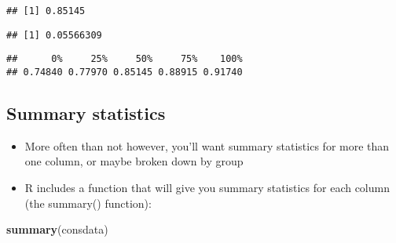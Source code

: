\documentclass[]{article}
\newenvironment{Shaded}{\begin{snugshade}}{\end{snugshade}}
\newcommand{\KeywordTok}[1]{\textcolor[rgb]{0.13,0.29,0.53}{\textbf{#1}}}
\newcommand{\OperatorTok}[1]{\textcolor[rgb]{0.81,0.36,0.00}{\textbf{#1}}}
\newcommand{\NormalTok}[1]{#1}
\providecommand{\tightlist}{%
  \setlength{\itemsep}{0pt}\setlength{\parskip}{0pt}}
\begin{document}
\begin{verbatim}
## [1] 0.85145
\end{verbatim}

\begin{Shaded}
\end{Shaded}

\begin{verbatim}
## [1] 0.05566309
\end{verbatim}

\begin{Shaded}
\end{Shaded}

\begin{verbatim}
##      0%     25%     50%     75%    100% 
## 0.74840 0.77970 0.85145 0.88915 0.91740
\end{verbatim}

\subsection{Summary statistics}\label{summary-statistics-1}

\begin{itemize}
\tightlist
\item
  More often than not however, you'll want summary statistics for more
  than one column, or maybe broken down by group
\item
  R includes a function that will give you summary statistics for each
  column (the summary() function):
\end{itemize}

\begin{Shaded}
\begin{Highlighting}[]
\KeywordTok{summary}\NormalTok{(consdata)}
\end{Highlighting}
\end{Shaded}
\end{document}
